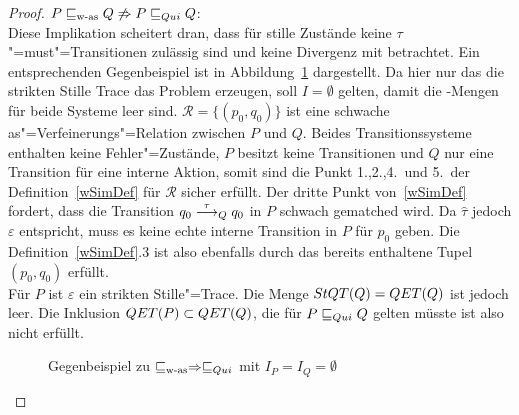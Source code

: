 \begin{proof}
  $P \sqsubseteq _{\mathrm{w}\text{-}\mathrm{as}} Q \not\Rightarrow P  \sqsubseteq  _{Qui} Q$:\\
  Diese Implikation scheitert dran, dass für stille Zustände keine
  $\tau$"=must"=Transitionen zulässig sind und \QRel{} keine Divergenz mit
  betrachtet. Ein entsprechenden Gegenbeispiel ist in
  Abbildung~\ref{QuiWasGegenBsp} dargestellt. Da hier nur das die strikten
  Stille Trace das Problem erzeugen, soll $I = \emptyset$ gelten, damit die
  \MIT{}-Mengen für beide Systeme leer sind. $\mathcal{R} = \{(p_0,q_0)\}$ ist
  eine schwache as"=Verfeinerungs"=Relation zwischen $P$ und $Q$. Beides
  Transitionssysteme enthalten keine Fehler"=Zustände, $P$ besitzt keine
  Transitionen und $Q$ nur eine Transition für eine interne Aktion, somit sind
  die Punkt 1.,2.,4.\ und 5.\ der Definition~\ref{wSimDef} für $\mathcal{R}$
  sicher erfüllt. Der dritte Punkt von~\ref{wSimDef} fordert, dass die
  Transition $q_0 \must[\tau]_Q q_0$ in $P$ schwach gematched wird. Da
  $\hat{\tau}$ jedoch $\varepsilon$ entspricht, muss es keine echte interne
  Transition in $P$ für $p_0$ geben. Die Definition~\ref{wSimDef}.3 ist also
  ebenfalls durch das bereits enthaltene Tupel $(p_0,q_0)$ erfüllt.\\
  Für $P$ ist $\varepsilon$ ein strikten Stille"=Trace. Die Menge $StQT (Q) =
  QET (Q)$ ist jedoch leer. Die Inklusion $QET (P) \subset QET (Q)$, die für
  $P \sqsubseteq  _{Qui} Q$ gelten müsste ist also nicht erfüllt.

  \begin{figure}[htbp]
    \begin{center}
      \caption{Gegenbeispiel zu $\sqsubseteq _{\mathrm{w}\text{-}\mathrm{as}} \Rightarrow  \sqsubseteq  _{Qui}$ mit $I_P = I_Q =
      \emptyset$}
      \label{QuiWasGegenBsp}
    \end{center}
  \end{figure}


\end{proof}
